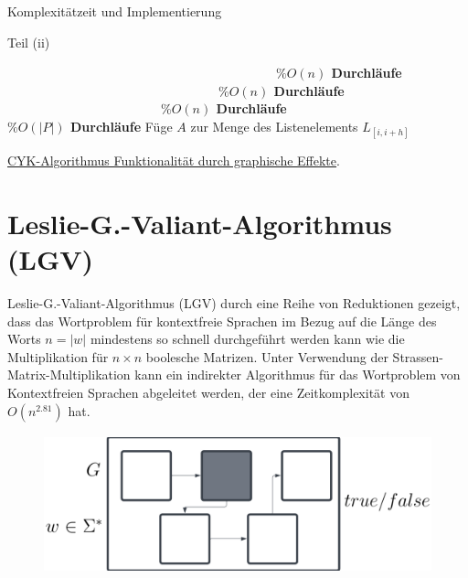 \documentclass{beamer}
\begin{document}
	\begin{frame}{Komplexitätzeit und Implementierung}
		\begin{algorithm}[H]
			\caption[Teil (ii)]{Teil (ii)}
			\label{algorithm10}
			\begin{algorithmic}[1]
				 \ \ \ \ \ \ \ \ \ \ \ \ \ \ \ \ \ \ \ \ \ \ \ \ \ \ \ \ \ \ \ \ \ \ \ \ \ \ \ \ \ \ \textbf{$ \%O(n)$ Durchläufe}
				 \ \ \ \ \ \ \ \ \ \ \ \ \ \ \ \ \ \ \ \ \ \ \ \ \ \ \ \ \ \ \ \ \ \textbf{$ \%O(n)$ Durchläufe}
				 \ \ \ \ \ \ \ \ \ \ \ \ \ \ \ \ \ \ \ \ \ \ \ \ \textbf{$ \%O(n)$ Durchläufe}
				 \ \ \ \ \ \ \ \ \ \ \ \ \ \ \ \ \ \ \ \ \textbf{$\%O(|P|)$ Durchläufe}
				\State Füge $A$ zur Menge des Listenelements $L_{[i,i+h]}$
				\EndIf
				\EndFor
				\EndFor
				\EndFor
				\EndFor
			\end{algorithmic}
		\end{algorithm}
		 \href{http://www.cip.ifi.lmu.de/~lindebar/}{CYK-Algorithmus Funktionalität durch graphische Effekte}.
	\end{frame}
	
	
	
	\section{Leslie-G.-Valiant-Algorithmus (LGV)}
	
	
	
	\begin{frame}{Leslie-G.-Valiant-Algorithmus (LGV)}
		durch eine Reihe von Reduktionen gezeigt, dass das Wortproblem für kontextfreie Sprachen im Bezug auf die Länge des Worts $n=|w|$ mindestens so schnell durchgeführt werden kann wie die Multiplikation für $n \times n$ boolesche Matrizen. Unter Verwendung der Strassen-Matrix-Multiplikation kann ein indirekter Algorithmus für das Wortproblem von Kontextfreien Sprachen abgeleitet werden, der eine Zeitkomplexität von $O(n^{2.81})$ hat.
		\begin{figure}
			\centering
			\includegraphics[width=12cm,height=4cm]{img/LGVT}
		\end{figure}
	\end{frame}
\end{document}
